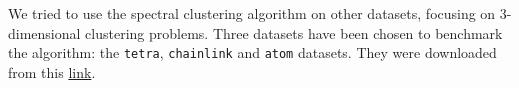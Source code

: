 We tried to use the spectral clustering algorithm on other datasets, focusing on 3-dimensional clustering problems. Three datasets have been chosen to benchmark the algorithm: the \texttt{tetra}, \texttt{chainlink} and \texttt{atom} datasets. They were downloaded from this \href{https://github.com/deric/clustering-benchmark}{link}.

\begin{figure}[H]
    \centering

\end{figure}
